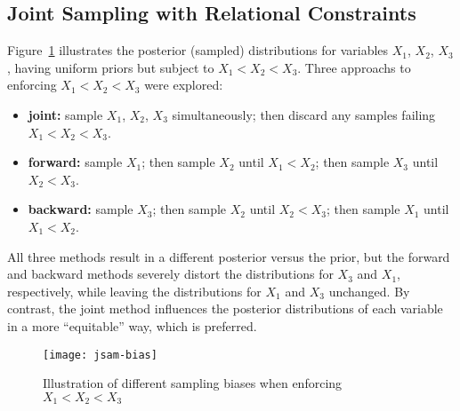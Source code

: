 \subsection{Joint Sampling with Relational Constraints}\label{app.math.distr.jsam}
Figure~\ref{fig:jsam.bias} illustrates the posterior (sampled) distributions
for variables $X_1$, $X_2$, $X_3$, having uniform priors but subject to $X_1 < X_2 < X_3$.
Three approachs to enforcing $X_1 < X_2 < X_3$ were explored:
\begin{itemize}
  \item \textbf{joint:}
    sample $X_1$, $X_2$, $X_3$ simultaneously;
    then discard any samples failing $X_1 < X_2 < X_3$.
  \item \textbf{forward:}
    sample $X_1$;
    then sample $X_2$ until $X_1 < X_2$;
    then sample $X_3$ until $X_2 < X_3$.
  \item \textbf{backward:}
    sample $X_3$;
    then sample $X_2$ until $X_2 < X_3$;
    then sample $X_1$ until $X_1 < X_2$.
\end{itemize}
All three methods result in a different posterior versus the prior,
but the forward and backward methods
severely distort the distributions for $X_3$ and $X_1$, respectively,
while leaving the distributions for $X_1$ and $X_3$ unchanged.
By contrast, the joint method influences the posterior distributions of each variable
in a more ``equitable'' way, which is preferred.
\begin{figure}[h]
  \centering
  \texttt{[image: jsam-bias]}
  \caption{Illustration of different sampling biases when enforcing $X_1 < X_2 < X_3$}
  \label{fig:jsam.bias}
\end{figure}
